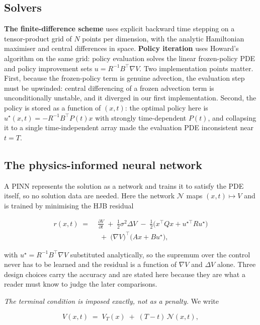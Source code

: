 \documentclass[conference]{IEEEtran}
\begin{document}
\subsection{Solvers}
\textbf{The finite-difference scheme} uses explicit backward time stepping on a tensor-product grid of
$N$ points per dimension, with the analytic Hamiltonian maximiser and central differences in
space. \textbf{Policy iteration} uses Howard's algorithm on the same grid: policy evaluation
solves the linear frozen-policy PDE and policy improvement sets $u = R^{-1}B^\top\nabla V$. Two
implementation points matter. First, because the frozen-policy term is genuine advection, the
evaluation step must be upwinded: central differencing of a frozen advection term is
unconditionally unstable, and it diverged in our first implementation. Second, the policy is
stored as a function of $(x,t)$: the optimal policy here is $u^\star(x,t)=-R^{-1}B^\top P(t)x$
with strongly time-dependent $P(t)$, and collapsing it to a single time-independent array made
the evaluation PDE inconsistent near $t=T$.

\subsection{The physics-informed neural network}
A PINN represents the solution as a network and trains it to satisfy the PDE itself, so no
solution data are needed. Here the network $\mathcal{N}$ maps $(x,t)\mapsto V$ and is trained by
minimising the HJB residual

\begin{equation}
\begin{split}
r(x,t) \;=\; & \frac{\partial V}{\partial t} \;+\; \frac{1}{2}\sigma^{2}\Delta V
   \;-\; \tfrac12\big(x^\top Q x + u^{\star\top} R u^{\star}\big) \\
   & \;+\; \big(\nabla V\big)^\top\!\big(Ax + Bu^{\star}\big),
\end{split}
\end{equation}

with $u^{\star}=R^{-1}B^\top\nabla V$ substituted analytically, so the supremum over the control
never has to be learned and the residual is a function of $\nabla V$ and $\Delta V$ alone. Three
design choices carry the accuracy and are stated here because they are what a reader must know to
judge the later comparisons.

\emph{The terminal condition is imposed exactly, not as a penalty.} We write

\begin{equation}
V(x,t) \;=\; V_T(x) \;+\; (T-t)\,\mathcal{N}(x,t),
\end{equation}
\end{document}
